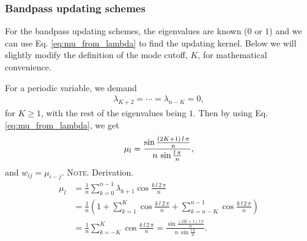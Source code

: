 \documentclass[reprint, superscriptaddress, floatfix]{revtex4-1}
\newcommand{\note}[1]{{\color{DarkGreen}\footnotesize \textsc{Note.} #1}}
\begin{document}
\subsubsection{\label{sec:homo_bandpass}
Bandpass updating schemes}



For the bandpass updating schemes,
the eigenvalues are known ($0$ or $1$) and
we can use Eq. \eqref{eq:mu_from_lambda}
to find the updating kernel.
%
Below we will slightly modify the definition of
the mode cutoff, $K$,
for mathematical convenience.

For a periodic variable, we demand
%
$$
\begin{aligned}
\lambda_{K+2} = \cdots = \lambda_{n-K} = 0,
\end{aligned}
$$
for $K \ge 1$,
with the rest of the eigenvalues being $1$.
%
Then by using
Eq. \eqref{eq:mu_from_lambda},
we get
\begin{equation}
  \mu_l
  =
  \frac{
    \sin
    \frac{ (2 K + 1) \, l \, \pi }
         {              n        }
  }
  {
    n \, \sin \frac{ l \, \pi } { n }
  }
  ,
\notag
\end{equation}
and $w_{ij} = \mu_{i-j}$.
%
\note{Derivation.
$$
\begin{aligned}
\mu_l
&=
\frac 1 n \sum_{k = 0}^{n-1} \lambda_{k+1} \cos \frac{ k \, l \, 2 \, \pi } { n }
\\
&=
\frac{1}{n}
\left(
  1 +
  \sum_{k=1}^K
  \cos \frac { k \, l \, 2 \, \pi } { n }
  +
  \sum_{k=n-K}^{n-1}
  \cos \frac { k \, l \, 2 \, \pi } { n }
\right)
\\
&=
\frac 1 n
\sum_{k=-K}^K
\cos \frac { k \, l \, 2 \, \pi } { n }
=
  \frac{
    \sin
    \frac{ (2 K + 1) \, l \, \pi }
         {              n        }
  }
  {
    n \, \sin \frac{ l \, \pi } { n }
  }
.
\end{aligned}
$$
}
\end{document}
